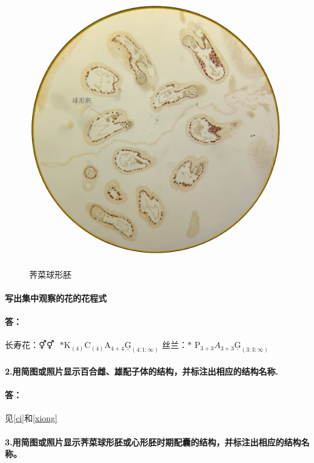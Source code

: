 \documentclass[UTF8]{ctexart}
\begin{document}
\begin{figure}[h]
    \centering
    \includegraphics[scale=0.08]{src/botany/微信图片_20201218171809.jpg}
    \label{jicai}
    \caption{荠菜球形胚}
\end{figure}
\paragraph*{写出集中观察的花的花程式}
\paragraph*{答：}长寿花：⚥$\text{⚥}\text{ }\text{*}\text{K}_{(4)}\text{C}_{(4)}\text{A}_{4+4}\underline{\text{G}}_{(4:1:\infty)}$
丝兰：$\text{*}\text{ P}_{3+3}A_{3+3}\underline{\text{G}}_{(3:3:\infty)}$
\paragraph*{2.用简图或照片显示百合雌、雄配子体的结构，并标注出相应的结构名称.}
\paragraph*{答：}见\ref{ci}和\ref{xiong}
\paragraph*{3.用简图或照片显示荠菜球形胚或心形胚时期配囊的结构，并标注出相应的结构名称。}
\end{document}
